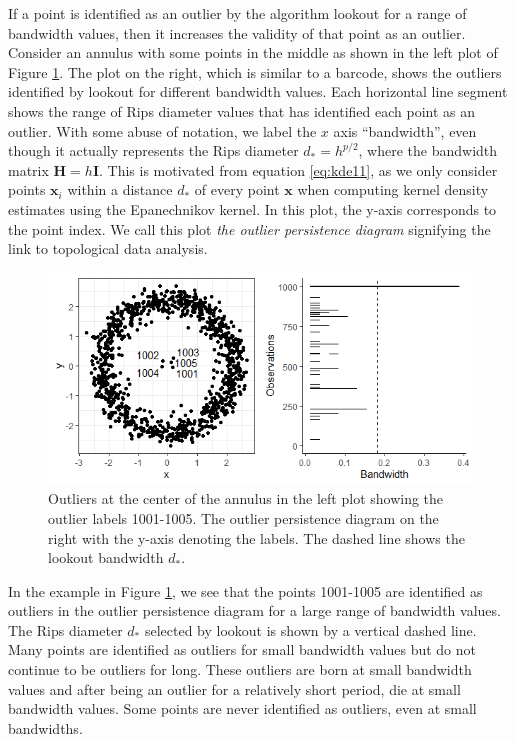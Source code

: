 \documentclass[11pt,a4paper,]{article}
\theoremstyle{definition}
\theoremstyle{definition}
\theoremstyle{definition}
\theoremstyle{remark}
\begin{document}
If a point is identified as an outlier by the algorithm lookout for a range of bandwidth values, then it increases the validity of that point as an outlier. Consider an annulus with some points in the middle as shown in the left plot of Figure \ref{fig:outlierpersistence}. The plot on the right, which is similar to a barcode, shows the outliers identified by lookout for different bandwidth values. Each horizontal line segment shows the range of Rips diameter values that has identified each point as an outlier. With some abuse of notation, we label the \(x\) axis ``bandwidth'', even though it actually represents the Rips diameter \(d_* = h^{p/2}\), where the bandwidth matrix \(\bm{H} = h\bm{I}\). This is motivated from equation \eqref{eq:kde11}, as we only consider points \(\bm{x}_i\) within a distance \(d_*\) of every point \(\bm{x}\) when computing kernel density estimates using the Epanechnikov kernel. In this plot, the y-axis corresponds to the point index. We call this plot \emph{the outlier persistence diagram} signifying the link to topological data analysis.

\begin{figure}[!ht]
    \centering
    \includegraphics[scale=0.8]{../Graphics/Outlier_Persistence.png}
    \caption{Outliers at the center of the annulus in the left plot showing the outlier labels 1001-1005. The outlier persistence diagram on the right with the y-axis denoting the labels. The dashed line shows the lookout bandwidth $d_*$.}
    \label{fig:outlierpersistence}
\end{figure}

In the example in Figure \ref{fig:outlierpersistence}, we see that the points 1001-1005 are identified as outliers in the outlier persistence diagram for a large range of bandwidth values. The Rips diameter \(d_*\) selected by lookout is shown by a vertical dashed line. Many points are identified as outliers for small bandwidth values but do not continue to be outliers for long. These outliers are born at small bandwidth values and after being an outlier for a relatively short period, die at small bandwidth values. Some points are never identified as outliers, even at small bandwidths.
\end{document}
